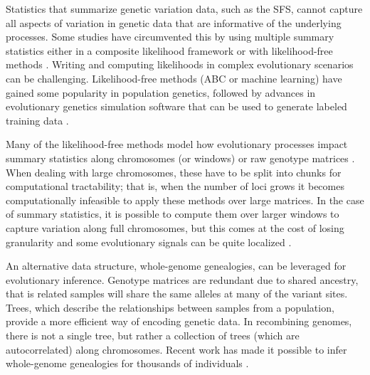 Statistics that summarize genetic variation data, such as the SFS, cannot capture all aspects of variation in genetic data that are informative of the underlying processes.
Some studies have circumvented this by using multiple summary statistics either in a composite likelihood framework or with likelihood-free methods \citep{nielsen_genomic_2005, degiorgio_sweepfinder2_2016, sheehan_deep_2016, caldas_inference_2022, pavlidis_sweed_2013}.
Writing and computing likelihoods in complex evolutionary scenarios can be challenging.
Likelihood-free methods (\eg ABC or machine learning) have gained some popularity in population genetics,
followed by advances in evolutionary genetics simulation software that can be used to generate labeled training data \citep{haller_tree-sequence_2019, kelleher_efficient_2016, ralph_efficiently_2020}.

Many of the likelihood-free methods model how evolutionary processes impact summary statistics along chromosomes (or windows) or raw genotype matrices \citep{schrider_shic_2016, flagel_unreasonable_2019, sheehan_deep_2016}.
When dealing with large chromosomes, these have to be split into chunks for computational tractability;
that is, when the number of loci grows it becomes computationally infeasible to apply these methods over large matrices.
In the case of summary statistics, it is possible to compute them over larger windows to capture variation along full chromosomes,
but this comes at the cost of losing granularity and some evolutionary signals can be quite localized \citep{caldas_inference_2022}.

An alternative data structure, whole-genome genealogies, can be leveraged for evolutionary inference.
Genotype matrices are redundant due to shared ancestry, that is related samples will share the same alleles at many of the variant sites.
Trees, which describe the relationships between samples from a population, provide a more efficient way of encoding genetic data.
In recombining genomes, there is not a single tree, but rather a collection of trees (which are autocorrelated) along chromosomes.
Recent work has made it possible to infer whole-genome genealogies for thousands of individuals \citep{speidel_inferring_2021, kelleher_inferring_2019, zhang_biobank-scale_2023}.

